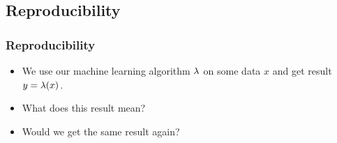 \subsection{Reproducibility}

\begin{frame}
  \frametitle{Reproducibility}
  \begin{itemize}
  \item We use our machine learning algorithm $\lambda$ on some data $x$ and get result $y = \lambda(x)$.
  \item What does this result mean?
  \item Would we get the same result again?
  \end{itemize}
\end{frame}

